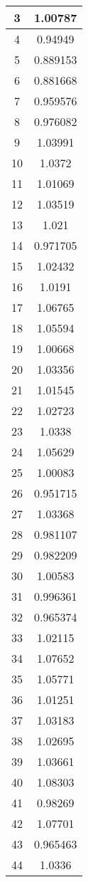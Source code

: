 \begin{table}[h]
\begin{subtable}[h]{2in}
{\begin{tabular}{|c|c|}
3	&	1.00787	\\	\hline
4	&	0.94949	\\	\hline
5	&	0.889153	\\	\hline
6	&	0.881668	\\	\hline
7	&	0.959576	\\	\hline
8	&	0.976082	\\	\hline
9	&	1.03991	\\	\hline
10	&	1.0372	\\	\hline
11	&	1.01069	\\	\hline
12	&	1.03519	\\	\hline
13	&	1.021	\\	\hline
14	&	0.971705	\\	\hline
15	&	1.02432	\\	\hline
16	&	1.0191	\\	\hline
17	&	1.06765	\\	\hline
18	&	1.05594	\\	\hline
19	&	1.00668	\\	\hline
20	&	1.03356	\\	\hline
21	&	1.01545	\\	\hline
22	&	1.02723	\\	\hline
23	&	1.0338	\\	\hline
24	&	1.05629	\\	\hline
25	&	1.00083	\\	\hline
26	&	0.951715	\\	\hline
27	&	1.03368	\\	\hline
28	&	0.981107	\\	\hline
29	&	0.982209	\\	\hline
30	&	1.00583	\\	\hline
31	&	0.996361	\\	\hline
32	&	0.965374	\\	\hline
33	&	1.02115	\\	\hline
34	&	1.07652	\\	\hline
35	&	1.05771	\\	\hline
36	&	1.01251	\\	\hline
37	&	1.03183	\\	\hline
38	&	1.02695	\\	\hline
39	&	1.03661	\\	\hline
40	&	1.08303	\\	\hline
41	&	0.98269	\\	\hline
42	&	1.07701	\\	\hline
43	&	0.965463	\\	\hline
44	&	1.0336	\\	\hline

\end{tabular}}
\end{subtable}
\end{table}
